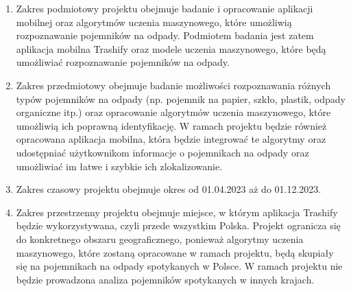 \documentclass[12pt,twoside]{book}
\begin{document}
\begin{enumerate}[label=--]
    \item Zakres podmiotowy projektu \topic  obejmuje badanie i opracowanie aplikacji mobilnej oraz algorytmów uczenia maszynowego, które umożliwią rozpoznawanie pojemników na odpady. Podmiotem badania jest zatem aplikacja mobilna Trashify oraz modele uczenia maszynowego, które będą umożliwiać rozpoznawanie pojemników na odpady.
    \item Zakres przedmiotowy obejmuje badanie możliwości rozpoznawania różnych typów pojemników na odpady (np. pojemnik na papier, szkło, plastik, odpady organiczne itp.) oraz opracowanie algorytmów uczenia maszynowego, które umożliwią ich poprawną identyfikację. W ramach projektu będzie również opracowana aplikacja mobilna, która będzie integrować te algorytmy oraz udostępniać użytkownikom informacje o pojemnikach na odpady oraz umożliwiać im łatwe i szybkie ich zlokalizowanie.
    \item Zakres czasowy projektu obejmuje okres od 01.04.2023 aż do 01.12.2023.
    \item Zakres przestrzenny projektu obejmuje miejsce, w którym aplikacja Trashify będzie wykorzystywana, czyli przede wszystkim Polska. Projekt ogranicza się do konkretnego obszaru geograficznego, ponieważ algorytmy uczenia maszynowego, które zostaną opracowane w ramach projektu, będą skupiały się na pojemnikach na odpady spotykanych w Polsce. W ramach projektu nie będzie prowadzona analiza pojemników spotykanych w innych krajach.
\end{enumerate}
\end{document}
